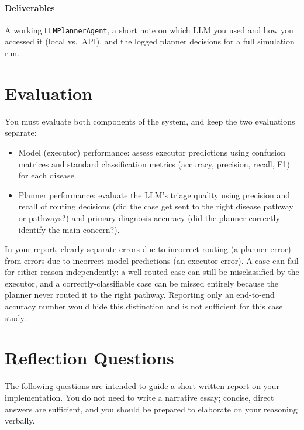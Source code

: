 \paragraph{Deliverables} A working \texttt{LLMPlannerAgent}, a short note on which LLM you used and how you accessed it (local vs.\ API), and the logged planner decisions for a full simulation run.


\section{Evaluation}
\label{sec:case3-evaluation}

You must evaluate both components of the system, and keep the two evaluations separate:

\begin{itemize}
    \item Model (executor) performance: assess executor predictions using confusion matrices and standard classification metrics (accuracy, precision, recall, F1) for each disease.
    \item Planner performance: evaluate the LLM's triage quality using precision and recall of routing decisions (did the case get sent to the right disease pathway or pathways?) and primary-diagnosis accuracy (did the planner correctly identify the main concern?).
\end{itemize}
%
In your report, clearly separate errors due to incorrect routing (a planner error) from errors due to incorrect model predictions (an executor error). A case can fail for either reason independently: a well-routed case can still be misclassified by the executor, and a correctly-classifiable case can be missed entirely because the planner never routed it to the right pathway. Reporting only an end-to-end accuracy number would hide this distinction and is not sufficient for this case study.


\section{Reflection Questions}
\label{sec:case3-reflection}

The following questions are intended to guide a short written report on your implementation. You do not need to write a narrative essay; concise, direct answers are sufficient, and you should be prepared to elaborate on your reasoning verbally.

